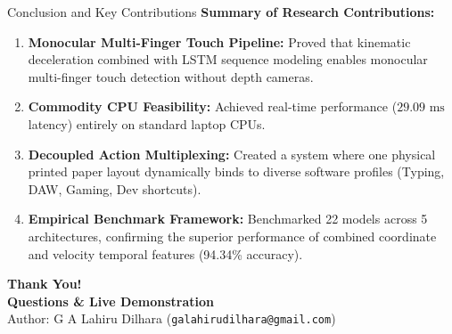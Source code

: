 \documentclass[aspectratio=169,10pt]{beamer}
\begin{document}
\begin{frame}{Conclusion and Key Contributions}
  \small
  \textbf{Summary of Research Contributions:}
  \begin{enumerate}
    \item \textbf{Monocular Multi-Finger Touch Pipeline:} Proved that kinematic deceleration combined with LSTM sequence modeling enables monocular multi-finger touch detection without depth cameras.
    \item \textbf{Commodity CPU Feasibility:} Achieved real-time performance ($29.09\text{ ms}$ latency) entirely on standard laptop CPUs.
    \item \textbf{Decoupled Action Multiplexing:} Created a system where one physical printed paper layout dynamically binds to diverse software profiles (Typing, DAW, Gaming, Dev shortcuts).
    \item \textbf{Empirical Benchmark Framework:} Benchmarked 22 models across 5 architectures, confirming the superior performance of combined coordinate and velocity temporal features (94.34\% accuracy).
  \end{enumerate}
  \vspace{0.8em}
  \begin{center}
    \Large \textbf{Thank You!} \\
    \vspace{0.3em}
    \small \textbf{Questions \& Live Demonstration} \\
    \footnotesize Author: G A Lahiru Dilhara \quad (\texttt{galahirudilhara@gmail.com})
  \end{center}
\end{frame}
\end{document}
